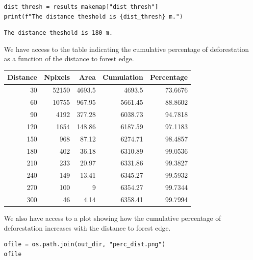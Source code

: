 \documentclass[paper=a4, 12pt, DIV=12]{scrartcl}
\begin{document}
\begin{verbatim}
dist_thresh = results_makemap["dist_thresh"]
print(f"The distance theshold is {dist_thresh} m.")
\end{verbatim}

\begin{verbatim}
The distance theshold is 180 m.
\end{verbatim}


We have access to the table indicating the cumulative percentage of deforestation as a function of the distance to forest edge.

\begin{center}
\begin{tabular}{rrrrr}
Distance & Npixels & Area & Cumulation & Percentage\\
\hline
30 & 52150 & 4693.5 & 4693.5 & 73.6676\\
60 & 10755 & 967.95 & 5661.45 & 88.8602\\
90 & 4192 & 377.28 & 6038.73 & 94.7818\\
120 & 1654 & 148.86 & 6187.59 & 97.1183\\
150 & 968 & 87.12 & 6274.71 & 98.4857\\
180 & 402 & 36.18 & 6310.89 & 99.0536\\
210 & 233 & 20.97 & 6331.86 & 99.3827\\
240 & 149 & 13.41 & 6345.27 & 99.5932\\
270 & 100 & 9 & 6354.27 & 99.7344\\
300 & 46 & 4.14 & 6358.41 & 99.7994\\
\end{tabular}
\end{center}

We also have access to a plot showing how the cumulative percentage of deforestation increases with the distance to forest edge.

\begin{verbatim}
ofile = os.path.join(out_dir, "perc_dist.png")
ofile
\end{verbatim}
\end{document}
